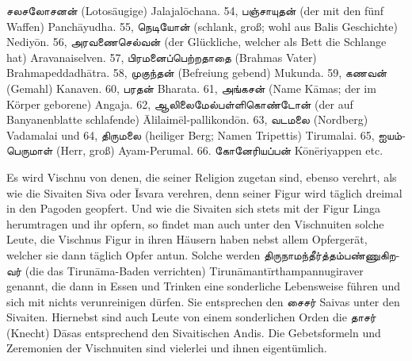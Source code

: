 \documentclass{article}
\newcommand{\TamilText}[1]{\texttamil{#1}}
\newcommand{\tam}[1]{\TamilText{#1}}
\begin{document}
\tam{சலசலோசனன்} (Lotosäugige) Jalajal\={o}chana. 54, \tam{பஞ்சாயுதன்} (der mit den fünf Waffen) Panch\={a}yudha. 55, \tam{நெடியோன்} (schlank, groß; wohl aus Balis Geschichte) Nediy\={o}n. 56, \tam{அரவணைசெல்வன்} (der Glückliche, welcher als Bett die Schlange hat) Aravanaiselven. 57, \tam{பிரமனைப்பெற்றதாதை} (Brahmas Vater) Brahmapeddadh\={a}tra. 58, \tam{முகுந்தன்} (Befreiung gebend) Mukunda. 59, \tam{கணவன்} (Gemahl) Kanaven. 60, \tam{பரதன்} Bharata. 61, \tam{அங்கசன்} (Name K\={a}mas; der im Körper geborene) Angaja. 62, \tam{ஆலிலைமேல்பள்ளிகொண்டோன்} (der auf Banyanenblatte schlafende) \={A}lilaim\={e}l-pallikond\={o}n. 63, \tam{வடமலை} (Nordberg) Vadamalai und 64, \tam{திருமலை} (heiliger Berg; Namen Tripettis) Tirumalai. 65, \tam{ஐயம்பெருமாள்} (Herr, groß) Ayam-Perumal. 66. \tam{கோனேரியப்பன்} K\={o}n\={e}riyappen etc.

Es wird Vischnu von denen, die seiner Religion zugetan sind, ebenso verehrt, als wie die Sivaiten Siva oder \={I}svara verehren, denn seiner Figur wird täglich dreimal in den Pagoden geopfert. Und wie die Sivaiten sich stets mit der Figur Linga herumtragen und ihr opfern, so findet man auch unter den Vischnuiten solche Leute, die Vischnus Figur in ihren Häusern haben nebst allem Opfergerät, welcher sie dann täglich Opfer antun. Solche werden \tam{திருநாமந்தீர்த்தம்பண்ணுகிறவர்} (die das Tirun\={a}ma-Baden verrichten) Tirun\={a}mant\={i}rthampannugiraver genannt, die dann in Essen und Trinken eine sonderliche Lebensweise führen und sich mit nichts verunreinigen dürfen. Sie entsprechen den \tam{சைசர்} Saivas unter den Sivaiten. Hiernebst sind auch Leute von einem sonderlichen Orden die \tam{தாசர்} (Knecht) D\={a}sas entsprechend den Sivaitischen Andis. Die Gebetsformeln und Zeremonien der Vischnuiten sind vielerlei und ihnen eigentümlich.
\end{document}

